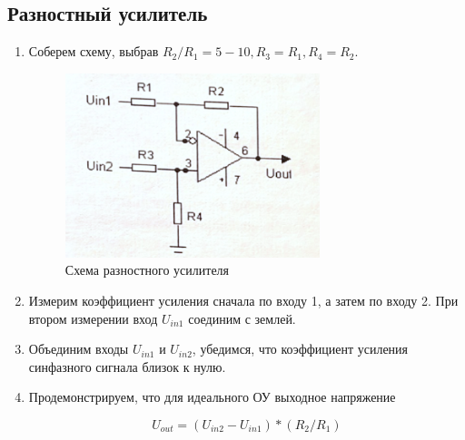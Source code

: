 \documentclass[a4paper, 12pt]{article}%
\begin{document}
\newpage
\subsection{Разностный усилитель}

\begin{enumerate}

\item Соберем схему, выбрав $R_2 / R_1 = 5-10, R_3 = R_1, R_4 = R_2$.

\begin{figure}[h]
\begin{center}
\includegraphics[width = 0.7\textwidth]{scheme4.png}
\caption{Схема разностного усилителя}
\end{center}
\end{figure}

\item Измерим коэффициент усиления сначала по входу 1, а затем по входу 2. При втором измерении вход $U_{in1}$ соединим с землей.
\item Объединим входы $U_{in1}$ и $U_{in2}$, убедимся, что коэффициент усиления синфазного сигнала близок к нулю.
\item Продемонстрируем, что для идеального ОУ выходное напряжение

\[U_{out} = (U_{in2}-U_{in1})*(R_2 / R_1)\]

\end{enumerate}
\end{document}
